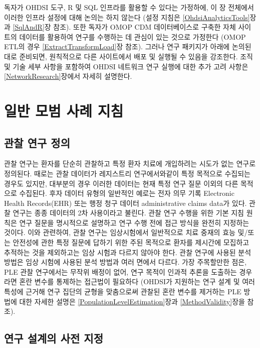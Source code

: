 \documentclass[10.5pt]{book}
\theoremstyle{definition}
\theoremstyle{definition}
\theoremstyle{definition}
\theoremstyle{remark}
\begin{document}
독자가 OHDSI 도구, R 및 SQL 인프라를 활용할 수 있다는 가정하에, 이 장
전체에서 이러한 인프라 설정에 대해 논의는 하지 않는다 (설정 지침은
\ref{OhdsiAnalyticsTools}장과 \ref{SqlAndR}장 참조). 또한 독자가 OMOP
CDM 데이터베이스로 구축한 자체 사이트의 데이터를 활용하여 연구를
수행하는 데 관심이 있는 것으로 가정한다 (OMOP ETL의 경우
\ref{ExtractTransformLoad}장 참조). 그러나 연구 패키지가 아래에 논의된
대로 준비되면, 원칙적으로 다른 사이트에서 배포 및 실행될 수 있음을
강조한다. 조직 및 기술 세부 사항을 포함하여 OHDSI 네트워크 연구 실행에
대한 추가 고려 사항은 \ref{NetworkResearch}장에서 자세히 설명한다.

\section{일반 모범 사례 지침}\label{---}

\subsection{관찰 연구 정의}\label{--}

관찰 연구는 환자를 단순히 관찰하고 특정 환자 치료에 개입하려는 시도가
없는 연구로 정의된다. 때로는 관찰 데이터가 레지스트리 연구에서와같이
특정 목적으로 수집되는 경우도 있지만, 대부분의 경우 이러한 데이터는 현재
특정 연구 질문 이외의 다른 목적으로 수집된다. 후자 데이터 유형의
일반적인 예로는 전자 의무 기록 Electronic Health Records(EHR) 또는 행정
청구 데이터 administrative claims data가 있다. 관찰 연구는 종종 데이터의
2차 사용이라고 불린다. 관찰 연구 수행을 위한 기본 지침 원칙은 연구
질문을 명시적으로 설명하고 연구 수행 전에 접근 방식을 완전히 지정하는
것이다. 이와 관련하여, 관찰 연구는 임상시험에서 일반적으로 치료 중재의
효능 및/또는 안전성에 관한 특정 질문에 답하기 위한 주된 목적으로 환자를
제시간에 모집하고 추적하는 것을 제외하고는 임상 시험과 다르지 않아야
한다. 관찰 연구에 사용된 분석 방법은 임상 시험에 사용된 분석 방법과 여러
면에서 다르다. 가장 주목할만한 점은, PLE 관찰 연구에서는 무작위 배정이
없어, 연구 목적이 인과적 추론을 도출하는 경우라면 혼란 변수를 통제하는
접근법이 필요하다 (OHDSI가 지원하는 연구 설계 및 여러 특성에 근거해 연구
집단의 균형을 맞춤으로써 관찰된 혼란 변수를 제거하는 PLE 방법에 대한
자세한 설명은 \ref{PopulationLevelEstimation}장과
\ref{MethodValidity}장을 참조).

\subsection{연구 설계의 사전 지정}\label{---}
\end{document}
